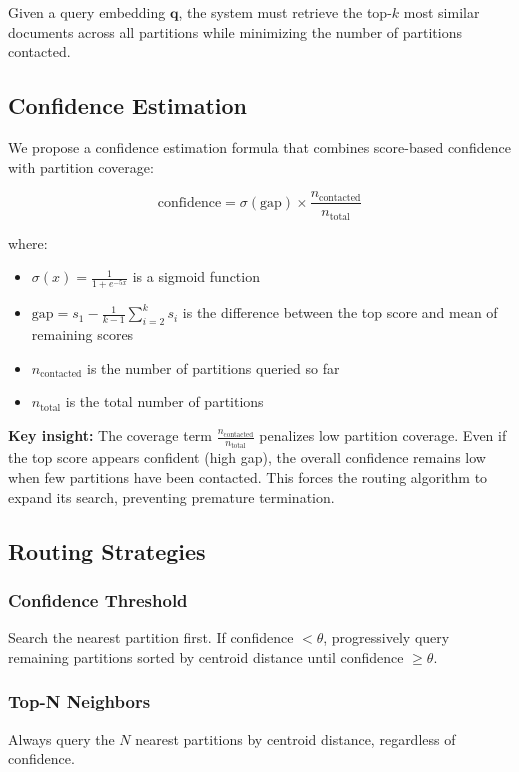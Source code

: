 \documentclass[10pt,twocolumn]{article}
\begin{document}
Given a query embedding $\mathbf{q}$, the system must retrieve the top-$k$ most similar documents across all partitions while minimizing the number of partitions contacted.

\subsection{Confidence Estimation}

We propose a confidence estimation formula that combines score-based confidence with partition coverage:

\begin{equation}
    \text{confidence} = \sigma(\text{gap}) \times \frac{n_{\text{contacted}}}{n_{\text{total}}}
\end{equation}

where:
\begin{itemize}
    \item $\sigma(x) = \frac{1}{1 + e^{-5x}}$ is a sigmoid function
    \item $\text{gap} = s_1 - \frac{1}{k-1}\sum_{i=2}^{k} s_i$ is the difference between the top score and mean of remaining scores
    \item $n_{\text{contacted}}$ is the number of partitions queried so far
    \item $n_{\text{total}}$ is the total number of partitions
\end{itemize}

\textbf{Key insight:} The coverage term $\frac{n_{\text{contacted}}}{n_{\text{total}}}$ penalizes low partition coverage. Even if the top score appears confident (high gap), the overall confidence remains low when few partitions have been contacted. This forces the routing algorithm to expand its search, preventing premature termination.

\subsection{Routing Strategies}

\subsubsection{Confidence Threshold}
Search the nearest partition first. If confidence $< \theta$, progressively query remaining partitions sorted by centroid distance until confidence $\geq \theta$.

\subsubsection{Top-N Neighbors}
Always query the $N$ nearest partitions by centroid distance, regardless of confidence.
\end{document}
